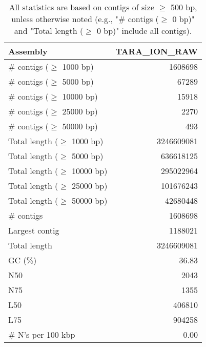 \documentclass[12pt,a4paper]{article}
\begin{document}
\begin{table}[ht]
\begin{center}
\caption{All statistics are based on contigs of size $\geq$ 500 bp, unless otherwise noted (e.g., "\# contigs ($\geq$ 0 bp)" and "Total length ($\geq$ 0 bp)" include all contigs).}
\begin{tabular}{|l*{1}{|r}|}
\hline
Assembly & TARA\_ION\_RAW \\ \hline
\# contigs ($\geq$ 1000 bp) & 1608698 \\ \hline
\# contigs ($\geq$ 5000 bp) & 67289 \\ \hline
\# contigs ($\geq$ 10000 bp) & 15918 \\ \hline
\# contigs ($\geq$ 25000 bp) & 2270 \\ \hline
\# contigs ($\geq$ 50000 bp) & 493 \\ \hline
Total length ($\geq$ 1000 bp) & 3246609081 \\ \hline
Total length ($\geq$ 5000 bp) & 636618125 \\ \hline
Total length ($\geq$ 10000 bp) & 295022964 \\ \hline
Total length ($\geq$ 25000 bp) & 101676243 \\ \hline
Total length ($\geq$ 50000 bp) & 42680448 \\ \hline
\# contigs & 1608698 \\ \hline
Largest contig & 1188021 \\ \hline
Total length & 3246609081 \\ \hline
GC (\%) & 36.83 \\ \hline
N50 & 2043 \\ \hline
N75 & 1355 \\ \hline
L50 & 406810 \\ \hline
L75 & 904258 \\ \hline
\# N's per 100 kbp & 0.00 \\ \hline
\end{tabular}
\end{center}
\end{table}
\end{document}

